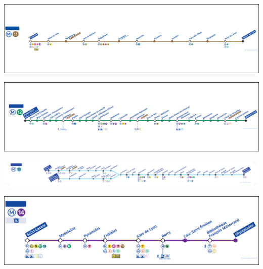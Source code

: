 \documentclass[,french]{article}
\begin{document}
\begin{landscape}
\includegraphics{img/plan_lignes/plan-de-ligne_metro_ligne-11.pdf}

\includegraphics{img/plan_lignes/plan-de-ligne_metro_ligne-12.pdf}

\includegraphics{img/plan_lignes/plan-de-ligne_metro_ligne-13.pdf}

\includegraphics{img/plan_lignes/plan-de-ligne_metro_ligne-14.pdf}

\end{landscape}

\newpage
\end{document}

